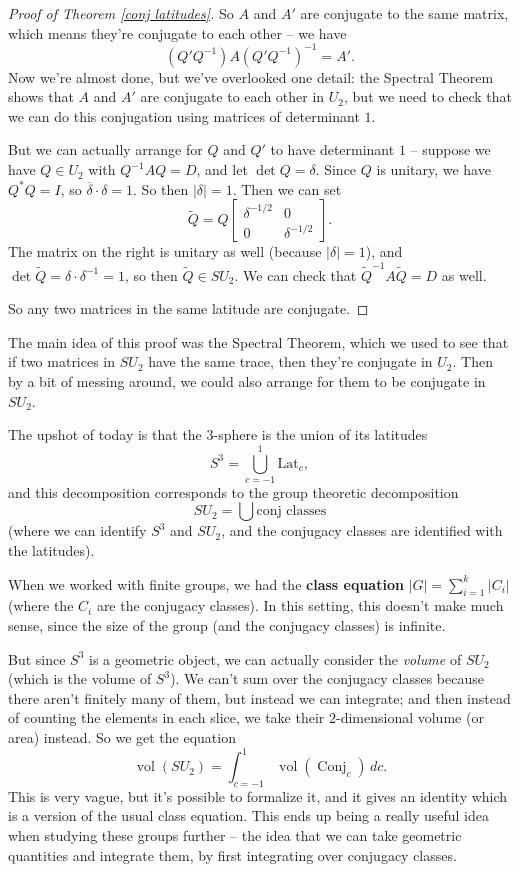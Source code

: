 \begin{proof}[Proof of Theorem \ref{conj latitudes}]
So $A$ and $A'$ are conjugate to the same matrix, which means they're conjugate to each other -- we have \[(Q'Q^{-1})A(Q'Q^{-1})^{-1} = A'.\] Now we're almost done, but we've overlooked one detail: the Spectral Theorem shows that $A$ and $A'$ are conjugate to each other in $U_2$, but we need to check that we can do this conjugation using matrices of determinant $1$. 

But we can actually arrange for $Q$ and $Q'$ to have determinant $1$ -- suppose we have $Q \in U_2$ with $Q^{-1}AQ = D$, and let $\det Q = \delta$. Since $Q$ is unitary, we have $Q^*Q = I$, so $\overline{\delta} \cdot \delta = 1$. So then $|\delta| = 1$. Then we can set \[\tilde{Q} = Q\begin{bmatrix} \delta^{-1/2} & 0 \\ 0 & \delta^{-1/2}\end{bmatrix}.\] The matrix on the right is unitary as well (because $|\delta| = 1$), and $\det \tilde{Q} = \delta \cdot \delta^{-1} = 1$, so then $\tilde{Q} \in SU_2$. We can check that $\tilde{Q}^{-1}A\tilde{Q} = D$ as well.

So any two matrices in the same latitude are conjugate. 
\end{proof}

\begin{note}
The main idea of this proof was the Spectral Theorem, which we used to see that if two matrices in $SU_2$ have the same trace, then they're conjugate in $U_2$. Then by a bit of messing around, we could also arrange for them to be conjugate in $SU_2$. 
\end{note}

The upshot of today is that the $3$-sphere is the union of its latitudes \[ S^3 = \bigcup_{c=-1}^1 \text{Lat}_c, \] 
and this decomposition corresponds to the group theoretic decomposition \[SU_2 = \bigcup \text{conj classes}\] (where we can identify $S^3$ and $SU_2$, and the conjugacy classes are identified with the latitudes). 

When we worked with finite groups, we had the \textbf{class equation} $|G| = \sum_{i = 1}^k |C_i|$ (where the $C_i$ are the conjugacy classes). In this setting, this doesn't make much sense, since the size of the group (and the conjugacy classes) is infinite. 

But since $S^3$ is a geometric object, we can actually consider the \emph{volume} of $SU_2$ (which is the volume of $S^3$). We can't sum over the conjugacy classes because there aren't finitely many of them, but instead we can integrate; and then instead of counting the elements in each slice, we take their $2$-dimensional volume (or area) instead. So we get the equation \[\operatorname{vol}(SU_2) = \int_{c = -1}^1 \operatorname{vol}(\operatorname{Conj}_c) \, dc.\] This is very vague, but it's possible to formalize it, and it gives an identity which is a version of the usual class equation. This ends up being a really useful idea when studying these groups further -- the idea that we can take geometric quantities and integrate them, by first integrating over conjugacy classes. 

